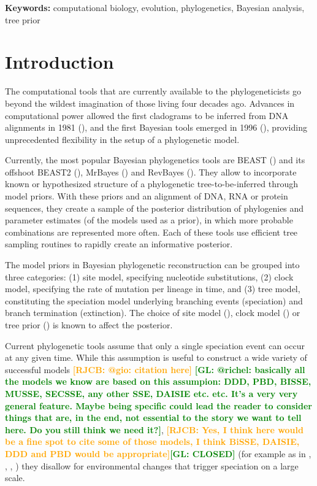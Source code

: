 \documentclass{article}
\newcommand*\richel[1]{\textcolor{orange}{\textbf{[RJCB: #1]}}}
\newcommand*\gio[1]{\textcolor{green}{\textbf{[GL: #1]}}}
\begin{document}
{\bf Keywords:} computational biology, evolution, phylogenetics, Bayesian analysis, tree prior

\section{Introduction}

The computational tools that are currently available 
to the phylogeneticists go beyond the wildest 
imagination of those living four decades ago.
Advances in computational power allowed the first cladograms to be inferred 
from DNA alignments in 1981 (\cite{felsenstein1981}), and  
the first Bayesian tools emerged in 1996 (\cite{rannala1996}),
providing unprecedented flexibility in the setup of a phylogenetic model.

Currently, the most popular Bayesian phylogenetics tools are
BEAST (\cite{beast}) and its offshoot BEAST2 (\cite{beast2}), 
MrBayes (\cite{mrbayes}) and RevBayes (\cite{revbayes}). 
They allow to incorporate known or hypothesized structure of a phylogenetic 
tree-to-be-inferred through model priors. 
With these priors and an alignment of DNA, RNA or protein sequences, 
they create a sample of the posterior distribution
of phylogenies and parameter estimates (of the models used as a prior), 
in which more probable combinations are represented more often.
Each of these tools use efficient tree sampling routines to rapidly create an 
informative posterior.

The model priors in Bayesian phylogenetic reconstruction 
can be grouped into three categories: (1) site model, specifying 
nucleotide substitutions, (2) clock model, specifying
the rate of mutation per lineage in time, and (3) tree model, 
constituting the speciation model underlying branching events (speciation) 
and branch termination (extinction).
The choice of site model (\cite{posada_and_buckley_2004}), 
clock model (\cite{baele_et_al_2012}) 
or tree prior (\cite{moller2018, yang_and_ranalla_2005}) is known to affect
the posterior.

Current phylogenetic tools assume that only a single speciation event can occur at any given time.
While this assumption is useful to construct a wide variety of successful models \richel{@gio: citation here} \gio{@richel: basically all the models we know are based on this assumpion: DDD, PBD, BISSE, MUSSE, SECSSE, any other SSE, DAISIE etc. etc. It's a very very general feature. Maybe being specific could lead the reader to consider things that are, in the end, not essential to the story we want to tell here. Do you still think we need it?},
\richel{Yes, I think here would be a fine spot to cite some of those models, 
I think BiSSE, DAISIE, DDD and PBD would be appropriate}\gio{CLOSED} 
(for example as in \cite{Maddison2007biSSE}, \cite{Valente2015}, \cite{etienne2012diversity}, \cite{etienne2014estimating})
they disallow for environmental changes that trigger speciation on a large scale.
\end{document}
